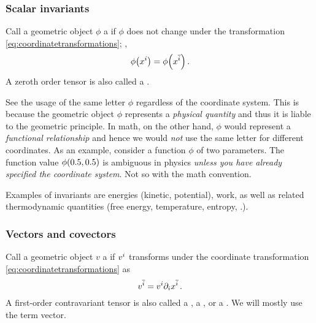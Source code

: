 \subsubsection{Scalar invariants}

\begin{definition}
  Call a geometric object $\phi$ a  if $\phi$ does not change under the transformation \cref{eq:coordinatetransformations}; \ie,
  \begin{equation}\label{eq:definitionofscalars}
    \phi\vat{\tvec\pos i} = \phi\vat{\atvec\pos i}\,.
  \end{equation}
  A zeroth order tensor is also called a .
\end{definition}

\begin{note}
  See the usage of the same letter $\phi$ regardless of the coordinate system. This is because the geometric object $\phi$ represents a \emph{physical quantity} and thus it is liable to the geometric principle. In math, on the other hand, $\phi$ would represent a \emph{functional relationship} and hence we would \emph{not} use the same letter for different coordinates. As an example, consider a function $\phi$ of two parameters. The function value $\phi\vat{0.5,0.5}$ is ambiguous in physics \emph{unless you have already specified the coordinate system}. Not so with the math convention.
\end{note}

Examples of invariants are energies (kinetic, potential), work, as well as related thermodynamic quantities (free energy, temperature, entropy, \etc.).


\subsubsection{Vectors and covectors}

\begin{definition}
  Call a geometric object $v$ a  if $\tvec vi$ transforms under the coordinate transformation \cref{eq:coordinatetransformations} as
  \begin{equation}\label{eq:vectortransformation}
    \atvec v i = \tvec vi\ipd i\atvec\pos i\,.
  \end{equation}
  A first-order contravariant tensor is also called a , a , or a . We will mostly use the term vector.
\end{definition}

